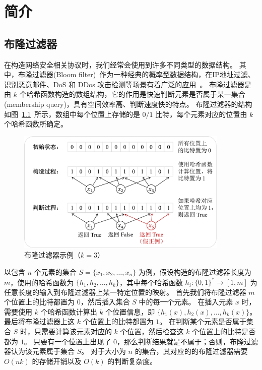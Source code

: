 
\chapter{简介}

\section{布隆过滤器}

在构造网络安全相关协议时，我们经常会使用到许多不同类型的数据结构。
其中，布隆过滤器(Bloom filter)~\cite{bloom1970space}作为一种经典的概率型数据结构，在IP地址过滤、识别恶意邮件、DoS 和 DDos 攻击检测等场景有着广泛的应用~\cite{geravand2013bloom}。
布隆过滤器是由 $k$ 个哈希函数构造的数组结构，它的作用是快速判断元素是否属于某一集合(membership query)，具有空间效率高、判断速度快的特点。
布隆过滤器的结构如图~\ref{fig:Bloom_example}~所示，数组中每个位置上存储的是 $0/1$ 比特，每个元素对应的位置由 $k$ 个哈希函数所确定。
\begin{figure}[ht]
  \centering
  \includegraphics[width=0.9\textwidth]{figures/bf_exp.pdf}
  \caption{布隆过滤器示例（$k=3$）}
  \label{fig:Bloom_example}
\end{figure}
以包含 $n$ 个元素的集合 $S=\{x_1, x_2, \dots, x_n\}$ 为例，假设构造的布隆过滤器长度为 $m$，使用的哈希函数为 $\{h_1, h_2, \dots, h_k\}$，其中每个哈希函数 $h_i:\{0,1\}^* \to [1, m]$ 为任意长度的输入到布隆过滤器上某一特定位置的映射。
首先我们将布隆过滤器 $m$ 个位置上的比特都置为 $0$，然后插入集合 $S$ 中的每一个元素。
在插入元素 $x$ 时，需要使用 $k$ 个哈希函数计算出 $k$ 个位置信息，即 $\{h_1(x),h_2(x),\dots, h_k(x)\}$。
最后将布隆过滤器上这 $k$ 个位置上的比特都置为 $1$。
在判断某个元素是否属于集合 $S$ 时，只需要计算该元素对应的 $k$ 个位置，然后检查这 $k$ 个位置上的比特是否都为 $1$。
只要有一个位置上出现了 $0$，那么判断结果就是不属于；否则，布隆过滤器认为该元素属于集合 $S$。
对于大小为 $n$ 的集合，其对应的的布隆过滤器需要 $O(nk)$ 的存储开销以及 $O(k)$ 的判断复杂度。

